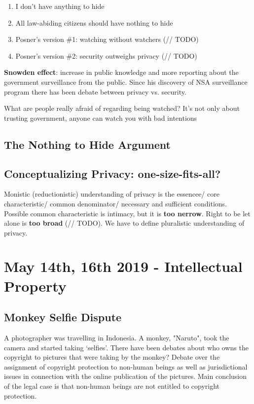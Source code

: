 \documentclass{article}
\begin{document}
\begin{enumerate}
    \item I don't have anything to hide
    \item All law-abiding citizens should have nothing to hide
    \item Posner's version \#1: watching without watchers (// TODO)
    \item Posner's version \#2: security outweighs privacy (// TODO)
\end{enumerate}

\textbf{Snowden effect}: increase in public knowledge and more reporting about the government surveillance from the public. Since his discovery of NSA surveillance program there has been debate between privacy vs. security.

What are people really afraid of regarding being watched? It's not only about trusting government, anyone can watch you with bad intentions

\subsection{The Nothing to Hide Argument}

\subsection{Conceptualizing Privacy: one-size-fits-all?}

Monistic (reductionistic) understanding of privacy is the essencee/ core characteristic/ common denominator/ necessary and sufficient conditions. Possible common characteristic is intimacy, but it is \textbf{too nerrow}. Right to be let alone is \textbf{too broad} (// TODO). We have to define pluralistic understanding of privacy. 

\section{May 14th, 16th 2019 - Intellectual Property}

\subsection{Monkey Selfie Dispute}

A photographer was travelling in Indonesia. A monkey, "Naruto", took the camera and started taking `selfies'. There have been debates about who owns the copyright to pictures that were taking by the monkey? Debate over the assignment of copyright protection to non-human beings as well as jurisdictional issues in connection with the online publication of the pictures. Main conclusion of the legal case is that non-human beings are not entitled to copyright protection.
\end{document}
